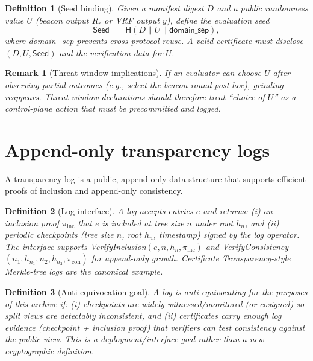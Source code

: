 \documentclass[11pt]{article}
\newtheorem{definition}{Definition}
\newtheorem{remark}{Remark}
\newcommand{\Hh}{\mathsf{H}}
\begin{document}
\begin{definition}[Seed binding]\label{def:seedbinding}
Given a manifest digest $D$ and a public randomness value $U$ (beacon output $R_r$ or VRF output $y$), define the evaluation seed
\[
\textsf{Seed} \;=\; \Hh(D\parallel U\parallel \textsf{domain\_sep}),
\]
where \textsf{domain\_sep} prevents cross-protocol reuse.
A valid certificate must disclose $(D,U,\textsf{Seed})$ and the verification data for $U$.
\end{definition}

\begin{remark}[Threat-window implications]
If an evaluator can choose $U$ \emph{after} observing partial outcomes (e.g., select the beacon round post-hoc), grinding reappears.
Threat-window declarations should therefore treat ``choice of $U$'' as a control-plane action that must be precommitted and logged.
\end{remark}

\section{Append-only transparency logs}
A transparency log is a public, append-only data structure that supports efficient proofs of inclusion and append-only consistency.

\begin{definition}[Log interface]\label{def:log}
A log accepts entries $e$ and returns:
(i) an \emph{inclusion proof} $\pi_{\mathrm{inc}}$ that $e$ is included at tree size $n$ under root $h_n$,
and (ii) periodic \emph{checkpoints} (tree size $n$, root $h_n$, timestamp) signed by the log operator.
The interface supports \textsf{VerifyInclusion}$(e,n,h_n,\pi_{\mathrm{inc}})$ and
\textsf{VerifyConsistency}$(n_1,h_{n_1},n_2,h_{n_2},\pi_{\mathrm{con}})$ for append-only growth.
Certificate Transparency-style Merkle-tree logs are the canonical example.\cite{rfc9162_ct}
\end{definition}

\begin{definition}[Anti-equivocation goal]\label{def:antiequiv}
A log is \emph{anti-equivocating} for the purposes of this archive if:
(i) checkpoints are widely witnessed/monitored (or cosigned) so split views are detectably inconsistent, and
(ii) certificates carry enough log evidence (checkpoint + inclusion proof) that verifiers can test consistency against the public view.
This is a deployment/interface goal rather than a new cryptographic definition.\cite{c2sp_tlog_witness,newman2022sigstore}
\end{definition}
\end{document}
